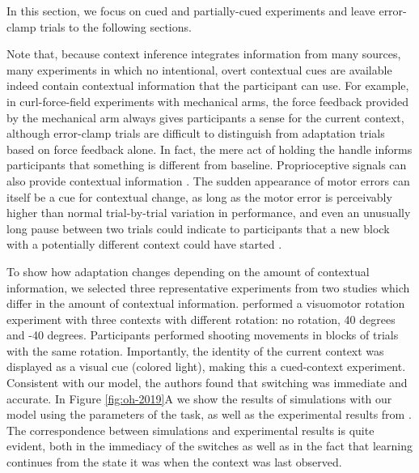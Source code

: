 \documentclass[a4paper,doc,floatsintext,natbib]{apa6}
\def \fref #1{Figure \ref{#1}}     %
\begin{document}
In this section, we focus on cued and partially-cued experiments and leave error-clamp trials to the following sections.

Note that, because context inference integrates information from many sources, many experiments in which no intentional, overt contextual cues are available indeed contain contextual information that the participant can use. For example, in curl-force-field experiments with mechanical arms, the force feedback provided by the mechanical arm always gives participants a sense for the current context, although error-clamp trials are difficult to distinguish from adaptation trials based on force feedback alone. In fact, the mere act of holding the handle informs participants that something is different from baseline. Proprioceptive signals can also provide contextual information \cite{Dizio_Motor_1995,Shadmehr_Adaptive_1994}. The sudden appearance of motor errors can itself be a cue for contextual change, as long as the motor error is perceivably higher than normal trial-by-trial variation in performance, and even an unusually long pause between two trials could indicate to participants that a new block with a potentially different context could have started \cite[e.g.][]{Ethier_Spontaneous_2008}.

To show how adaptation changes depending on the amount of contextual information, we selected three representative experiments from two studies which differ in the amount of contextual information. \cite{Kim_Neural_2015} performed a visuomotor rotation experiment with three contexts with different rotation: no rotation, 40 degrees and -40 degrees. Participants performed shooting movements in blocks of trials with the same rotation. Importantly, the identity of the current context was displayed as a visual cue (colored light), making this a cued-context experiment. Consistent with our model, the authors found that switching was immediate and accurate. In \fref{fig:oh-2019}A we show the results of simulations with our model using the parameters of the task, as well as the experimental results from \cite{Kim_Neural_2015}. The correspondence between simulations and experimental results is quite evident, both in the immediacy of the switches as well as in the fact that learning continues from the state it was when the context was last observed.
\end{document}
